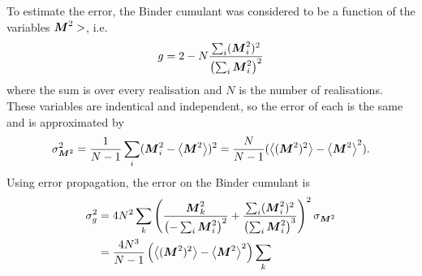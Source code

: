To estimate the error, the Binder cumulant was considered to be a function of the variables $ \boldsymbol{M}^2 >$, i.e.
\[
g = 2 - N \frac{\sum_i (\boldsymbol{M}^2_i)^2}{\left ( \sum_i \boldsymbol{M}^2_i\right)^2}
\]
where the sum is over every realisation and $N$ is the number of realisations. These variables are indentical and independent, so the error of each is the same and is approximated by 
\[
\sigma^2_{\boldsymbol{M}^2} = \frac{1}{N-1} \sum_i (\boldsymbol{M}^2_i - \left < \boldsymbol{M}^2 \right>)^2 = \frac{N}{N-1} (\left< (\boldsymbol{M}^2)^2 \right > - \left < \boldsymbol{M}^2\right>^2).
\] 
Using error propagation, the error on the Binder cumulant is 
\[
\begin{split}
\sigma_g^2 &= 4N^2 \sum_k \left( \frac{\boldsymbol{M}^2_k}{\left ( -\sum_i \boldsymbol{M}^2_i  \right )^2} + \frac{\sum_i (\boldsymbol{M}^2_i)^2}{\left(\sum_i \boldsymbol{M}^2_i \right)^3} \right)^2 \sigma_{\boldsymbol{M}^2} \\
	   &= \frac{4N^3}{N-1}\left(\left <(\boldsymbol{M}^2)^2 \right >   - \left<\boldsymbol{M}^2\right>^2 \right) \sum_k
\end{split}
\] 



